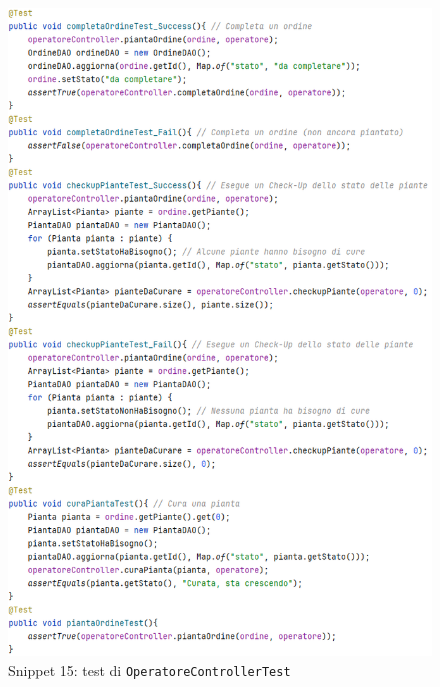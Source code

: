 \documentclass{article}
\newcommand{\code}[1]{\texttt{#1}}
\begin{document}
\begin{figure}[H]
    \centering
    \includegraphics[scale=0.65]{resources/images/Snippets/snippet_OperatoreControllerTest.png}
    \captionsetup{labelformat=empty,labelsep=none}
    \caption{Snippet 15: test di \code{OperatoreControllerTest}}
    \label{fig:snippet_OperatoreControllerTest}
\end{figure}
\end{document}
